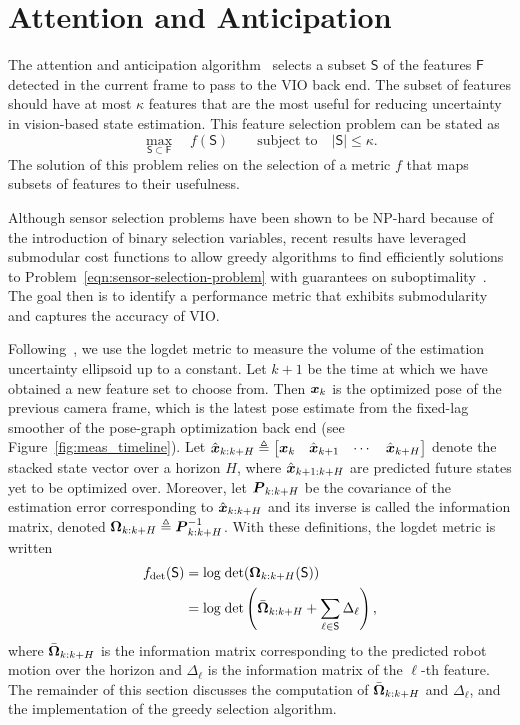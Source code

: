
\section{Attention and Anticipation}\label{sec:anticipation}

The attention and anticipation algorithm~\cite{Carlone2017} selects a subset $\mathsf{S}$ of the features $\mathsf{F}$ detected in the current frame to pass to the VIO back end.
The subset of features should have at most $\kappa$ features that are the most useful for reducing uncertainty in vision-based state estimation.
This feature selection problem can be stated as
\begin{equation}\label{eqn:sensor-selection-problem}
\max_{\mathsf{S}\subset\mathsf{F}} \quad f(\mathsf{S}) \qquad \text{subject to}\quad |\mathsf{S}|\le\kappa.
\end{equation}
The solution of this problem relies on the selection of a metric $f$ that maps subsets of features to their usefulness.

Although sensor selection problems have been shown to be NP-hard because of the introduction of binary selection variables, recent results have leveraged submodular cost functions to allow greedy algorithms to find efficiently solutions to Problem~\eqref{eqn:sensor-selection-problem} with guarantees on suboptimality~\cite{Shamaiah2010}.
The goal then is to identify a performance metric that exhibits submodularity and captures the accuracy of VIO.

Following~\cite{Carlone2017}, we use the logdet metric to measure the volume of the estimation uncertainty ellipsoid up to a constant.
Let $k+1$ be the time at which we have obtained a new feature set to choose from.
Then $\boldsymbol x_k$ is the optimized pose of the previous camera frame, which is the latest pose estimate from the fixed-lag smoother of the pose-graph optimization back end (see Figure~\ref{fig:meas_timeline}).
Let $\hat{\boldsymbol x}_{k:k+H}\triangleq\begin{bmatrix}\boldsymbol x_k&\hat{\boldsymbol x}_{k+1}&\cdots&\hat{\boldsymbol x}_{k+H}\end{bmatrix}$ denote the stacked state vector over a horizon $H$, where $\hat{\boldsymbol x}_{k+1:k+H}$ are predicted future states yet to be optimized over.
Moreover, let ${\boldsymbol P}_{k:k+H}$ be the covariance of the estimation error corresponding to $\hat{\boldsymbol x}_{k:k+H}$ and its inverse is called the information matrix, denoted ${\boldsymbol \Omega}_{k:k+H}\triangleq{\boldsymbol P}_{k:k+H}^{-1}$.
With these definitions, the logdet metric is written
\begin{align}
f_\text{det}(\mathsf{S}) &= \text{log}\;\text{det}({\boldsymbol \Omega}_{k:k+H}(\mathsf{S}))\\
&= \text{log}\;\text{det}\left(\bar{\boldsymbol \Omega}_{k:k+H} + \sum_{\ell\in\mathsf{S}}\Delta_\ell\right),
\end{align}
where $\bar{\boldsymbol \Omega}_{k:k+H}$ is the information matrix corresponding to the predicted robot motion over the horizon and $\Delta_\ell$ is the information matrix of the $\ell$-th feature.
The remainder of this section discusses the computation of $\bar{\boldsymbol \Omega}_{k:k+H}$ and $\Delta_\ell$, and the implementation of the greedy selection algorithm.


